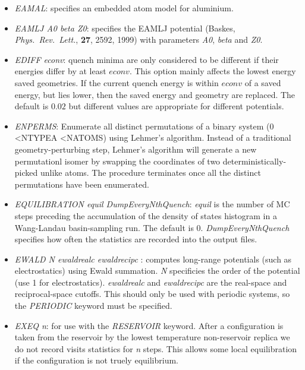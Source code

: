 \documentclass[12pt,a4paper,dvips]{article}
\begin{document}
\begin{itemize}
\item {\it EAMAL}: specifies an embedded atom model for aluminium.

\item {\it EAMLJ A0 beta Z0\/}: specifies the EAMLJ potential (Baskes, {\it Phys.~Rev.~Lett.\/},
{\bf 27}, 2592, 1999) with parameters {\it A0\/}, {\it beta\/} and {\it Z0\/}.

\item {\it EDIFF econv\/}: quench minima are only considered to be different if their
energies differ by at least $econv$. This option mainly affects the lowest energy
saved geometries. If the current quench energy is within $econv$ of a saved energy, but
lies lower, then the saved energy and geometry are replaced.
The default is $0.02$ but different values are appropriate for different potentials.

\item {\it ENPERMS\/}: Enumerate all distinct permutations of a binary system (0 \textless NTYPEA \textless NATOMS) using Lehmer's algorithm. Instead of a traditional geometry-perturbing step, Lehmer's algorithm will generate a new permutationl isomer by swapping the coordinates of two deterministically-picked unlike atoms. The procedure terminates once all the distinct permutations have been enumerated. 
 
\item {\it EQUILIBRATION equil DumpEveryNthQuench\/}: {\it equil} is the number of 
MC steps preceding the accumulation of the
density of states histogram in a Wang-Landau
basin-sampling run. The default is 0. {\it DumpEveryNthQuench} specifies how often the
statistics are recorded into the output files.

\item{\it EWALD N ewaldrealc ewaldrecipc \/}: computes long-range potentials (such as electrostatics)
using Ewald summation. {\it N\/} specificies the order of the potential (use 1 for electrostatics).
{\it ewaldrealc\/} and {\it ewaldrecipc\/} are the real-space and reciprocal-space cutoffs. This
should only be used with periodic systems, so the {\it PERIODIC\/} keyword must be specified.

\item {\it EXEQ n}: for use with the {\it RESERVOIR\/} keyword. After a configuration is
taken from the reservoir by the lowest temperature non-reservoir replica we do not
record visits statistics for {\it n} steps. This allows some local equilibration if
the configuration is not truely equilibrium.


\end{itemize}
\end{document}
